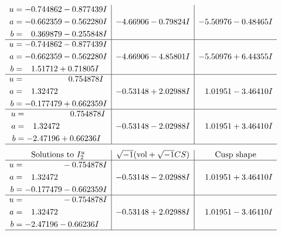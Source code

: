 \documentclass[1p]{elsarticle_modified}
\theoremstyle{definition}
\newcommand{\I}{\sqrt{-1}}
\begin{document}
$$\begin{array}{c|c|c}
\begin{aligned}
u &= -0.744862 - 0.877439 I \\
a &= -0.662359 - 0.562280 I \\
b &= \phantom{-}0.369879 - 0.255848 I\end{aligned}
 & -4.66906 - 0.79824 I & -5.50976 - 0.48465 I \\ \hline\begin{aligned}
u &= -0.744862 - 0.877439 I \\
a &= -0.662359 - 0.562280 I \\
b &= \phantom{-}1.51712 + 0.71805 I\end{aligned}
 & -4.66906 - 4.85801 I & -5.50976 + 6.44355 I \\ \hline\begin{aligned}
u &= \phantom{-0.000000 -}0.754878 I \\
a &= \phantom{-}1.32472\phantom{ +0.000000I} \\
b &= -0.177479 + 0.662359 I\end{aligned}
 & -0.53148 + 2.02988 I & \phantom{-}1.01951 - 3.46410 I \\ \hline\begin{aligned}
u &= \phantom{-0.000000 -}0.754878 I \\
a &= \phantom{-}1.32472\phantom{ +0.000000I} \\
b &= -2.47196 + 0.66236 I\end{aligned}
 & -0.53148 - 2.02988 I & \phantom{-}1.01951 + 3.46410 I\\
 \hline 
 \end{array}$$\newpage$$\begin{array}{c|c|c}  
\text{Solutions to }I^u_{2}& \I (\text{vol} + \sqrt{-1}CS) & \text{Cusp shape}\\
 \hline 
\begin{aligned}
u &= \phantom{-0.000000 } -0.754878 I \\
a &= \phantom{-}1.32472\phantom{ +0.000000I} \\
b &= -0.177479 - 0.662359 I\end{aligned}
 & -0.53148 - 2.02988 I & \phantom{-}1.01951 + 3.46410 I \\ \hline\begin{aligned}
u &= \phantom{-0.000000 } -0.754878 I \\
a &= \phantom{-}1.32472\phantom{ +0.000000I} \\
b &= -2.47196 - 0.66236 I\end{aligned}
 & -0.53148 + 2.02988 I & \phantom{-}1.01951 - 3.46410 I\\
 \hline 
 \end{array}$$\newpage
\end{document}
